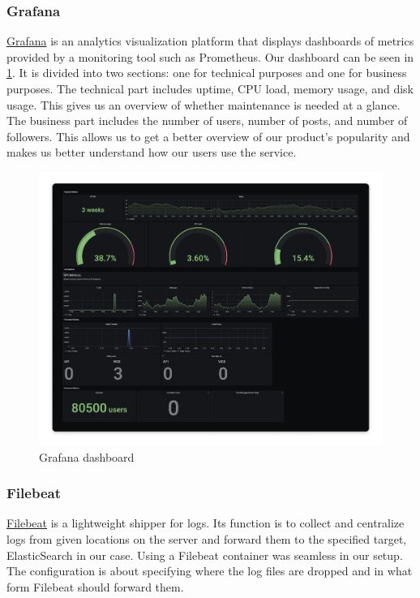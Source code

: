 \documentclass[11pt]{article}
\begin{document}
\subsubsection{Grafana}
\href{https://grafana.com/}{Grafana} is an analytics visualization platform that displays dashboards of metrics provided by a monitoring tool such as Prometheus. Our dashboard  can be seen in \ref{fig:dash}. It is divided into two sections: one for technical purposes and one for business purposes. The technical part includes uptime, CPU load, memory usage, and disk usage. This gives us an overview of whether maintenance is needed at a glance. The business part includes the number of users, number of posts, and number of followers. This allows us to get a better overview of our product's popularity and makes us better understand how our users use the service.
\begin{figure}[h!]
    \centering
    \includegraphics[width=16cm]{figures/dashboard.png}
    \caption{Grafana dashboard}
    \label{fig:dash}
\end{figure}

\subsubsection{Filebeat}
\href{https://www.elastic.co/beats/filebeat}{Filebeat} is a lightweight shipper for logs. Its function is to collect and centralize logs from given locations on the server and forward them to the specified target, ElasticSearch in our case. Using a Filebeat container was seamless in our setup. The configuration is about specifying where the log files are dropped and in what form Filebeat should forward them. 
\end{document}
